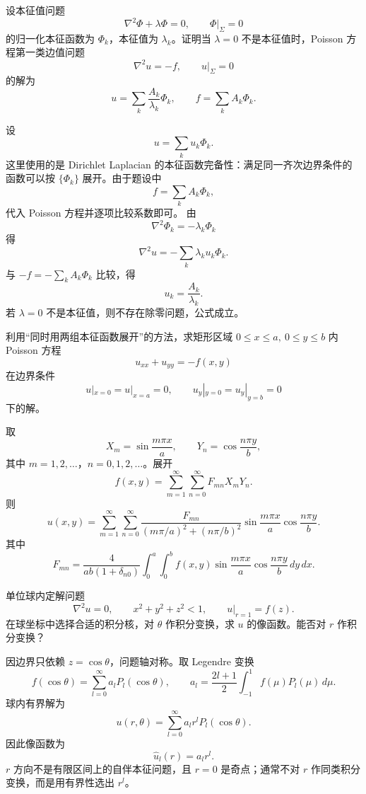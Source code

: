 ﻿


\begin{question}
设本征值问题
\[
\nabla^2\Phi+\lambda\Phi=0,\qquad \Phi|_\Sigma=0
\]
的归一化本征函数为 \(\Phi_k\)，本征值为 \(\lambda_k\)。证明当 \(\lambda=0\) 不是本征值时，Poisson 方程第一类边值问题
\[
\nabla^2u=-f,\qquad u|_\Sigma=0
\]
的解为
\[
u=\sum_k\frac{A_k}{\lambda_k}\Phi_k,\qquad
f=\sum_kA_k\Phi_k.
\]
\begin{solution}
设
\[
u=\sum_ku_k\Phi_k.
\]
这里使用的是 Dirichlet Laplacian 的本征函数完备性：满足同一齐次边界条件的函数可以按 \(\{\Phi_k\}\) 展开。由于题设中
\[
f=\sum_kA_k\Phi_k,
\]
代入 Poisson 方程并逐项比较系数即可。
由
\[
\nabla^2\Phi_k=-\lambda_k\Phi_k
\]
得
\[
\nabla^2u=-\sum_k\lambda_ku_k\Phi_k.
\]
与 \(-f=-\sum_kA_k\Phi_k\) 比较，得
\[
u_k=\frac{A_k}{\lambda_k}.
\]
若 \(\lambda=0\) 不是本征值，则不存在除零问题，公式成立。
\end{solution}
\end{question}

\begin{question}
利用“同时用两组本征函数展开”的方法，求矩形区域 \(0\le x\le a,\ 0\le y\le b\) 内 Poisson 方程
\[
u_{xx}+u_{yy}=-f(x,y)
\]
在边界条件
\[
u|_{x=0}=u|_{x=a}=0,\qquad
u_y|_{y=0}=u_y|_{y=b}=0
\]
下的解。
\begin{solution}
取
\[
X_m=\sin\frac{m\pi x}{a},\qquad
Y_n=\cos\frac{n\pi y}{b},
\]
其中 \(m=1,2,\ldots\)，\(n=0,1,2,\ldots\)。展开
\[
f(x,y)=\sum_{m=1}^{\infty}\sum_{n=0}^{\infty}F_{mn}X_mY_n.
\]
则
\[
u(x,y)=\sum_{m=1}^{\infty}\sum_{n=0}^{\infty}
\frac{F_{mn}}{(m\pi/a)^2+(n\pi/b)^2}
\sin\frac{m\pi x}{a}\cos\frac{n\pi y}{b}.
\]
其中
\[
F_{mn}=\frac{4}{ab(1+\delta_{n0})}
\int_0^a\int_0^b f(x,y)
\sin\frac{m\pi x}{a}\cos\frac{n\pi y}{b}\,dy\,dx.
\]
\end{solution}
\end{question}

\begin{question}
单位球内定解问题
\[
\nabla^2u=0,\qquad x^2+y^2+z^2<1,\qquad
u|_{r=1}=f(z).
\]
在球坐标中选择合适的积分核，对 \(\theta\) 作积分变换，求 \(u\) 的像函数。能否对 \(r\) 作积分变换？
\begin{solution}
因边界只依赖 \(z=\cos\theta\)，问题轴对称。取 Legendre 变换
\[
f(\cos\theta)=\sum_{l=0}^{\infty}a_lP_l(\cos\theta),
\qquad
a_l=\frac{2l+1}{2}\int_{-1}^{1}f(\mu)P_l(\mu)\,d\mu.
\]
球内有界解为
\[
u(r,\theta)=\sum_{l=0}^{\infty}a_lr^lP_l(\cos\theta).
\]
因此像函数为
\[
\hat u_l(r)=a_lr^l.
\]
\(r\) 方向不是有限区间上的自伴本征问题，且 \(r=0\) 是奇点；通常不对 \(r\) 作同类积分变换，而是用有界性选出 \(r^l\)。
\end{solution}
\end{question}

